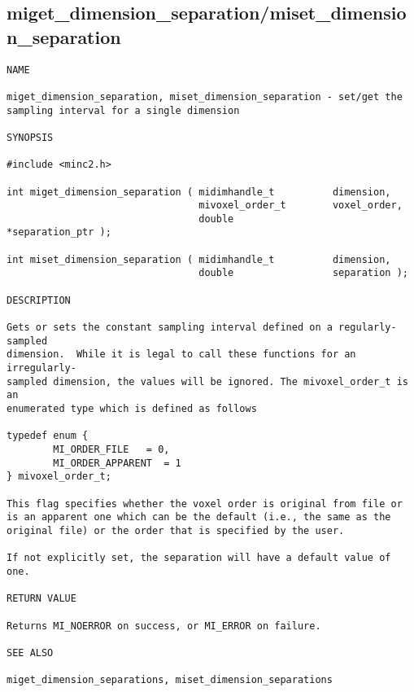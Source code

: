 \documentclass{article}
\begin{document}
\subsection{miget\_dimension\_separation/miset\_dimension\_separation}
\begin{verbatim}
NAME

miget_dimension_separation, miset_dimension_separation - set/get the 
sampling interval for a single dimension

SYNOPSIS

#include <minc2.h>

int miget_dimension_separation ( midimhandle_t          dimension,
                                 mivoxel_order_t        voxel_order,
                                 double                 *separation_ptr );

int miset_dimension_separation ( midimhandle_t          dimension,
                                 double                 separation );

DESCRIPTION

Gets or sets the constant sampling interval defined on a regularly-sampled
dimension.  While it is legal to call these functions for an irregularly-
sampled dimension, the values will be ignored. The mivoxel_order_t is an 
enumerated type which is defined as follows

typedef enum {
        MI_ORDER_FILE   = 0,
        MI_ORDER_APPARENT  = 1
} mivoxel_order_t;

This flag specifies whether the voxel order is original from file or
is an apparent one which can be the default (i.e., the same as the 
original file) or the order that is specified by the user.

If not explicitly set, the separation will have a default value of one.

RETURN VALUE

Returns MI_NOERROR on success, or MI_ERROR on failure.

SEE ALSO

miget_dimension_separations, miset_dimension_separations
\end{verbatim}
\end{document}
